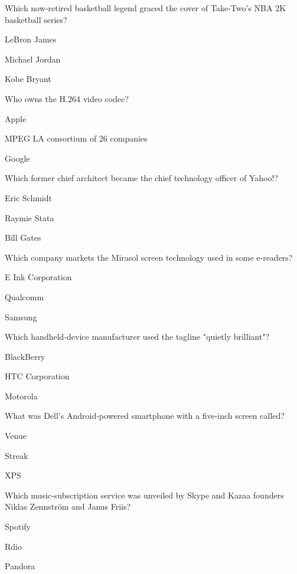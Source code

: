 \begin{enhancedmcq}{Which now‑retired basketball legend graced the cover of Take‑Two's NBA 2K basketball series?}
\item LeBron James
\item Michael Jordan
\item Kobe Bryant

\end{enhancedmcq}
\begin{enhancedmcq}{Who owns the H.264 video codec?}
\item Apple
\item MPEG LA consortium of 26 companies
\item Google

\end{enhancedmcq}
\begin{enhancedmcq}{Which former chief architect became the chief technology officer of Yahoo!?}
\item Eric Schmidt
\item Raymie Stata
\item Bill Gates

\end{enhancedmcq}
\begin{enhancedmcq}{Which company markets the Mirasol screen technology used in some e‑readers?}
\item E Ink Corporation
\item Qualcomm
\item Samsung

\end{enhancedmcq}
\begin{enhancedmcq}{Which handheld‑device manufacturer used the tagline "quietly brilliant"?}
\item BlackBerry
\item HTC Corporation
\item Motorola

\end{enhancedmcq}
\begin{enhancedmcq}{What was Dell's Android‑powered smartphone with a five‑inch screen called?}
\item Venue
\item Streak
\item XPS

\end{enhancedmcq}
\begin{enhancedmcq}{Which music‑subscription service was unveiled by Skype and Kazaa founders Niklas Zennström and Janus Friis?}
\item Spotify
\item Rdio
\item Pandora

\end{enhancedmcq}
